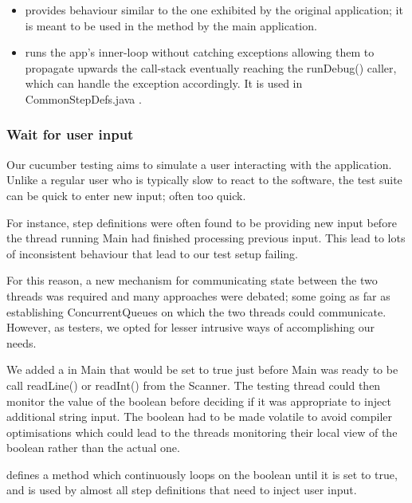 \begin{itemize}
	\item {} provides behaviour similar to the one exhibited by the original application; it is meant to be used in the  method by the main application. 
	\item {} runs the app's inner-loop without catching exceptions allowing them to propagate upwards the call-stack eventually reaching the runDebug() caller, which can handle the exception accordingly. It is used in CommonStepDefs.java . 
\end{itemize}

\subsubsection{Wait for user input}
Our cucumber testing aims to simulate a user interacting with the application.  Unlike a regular user who is typically slow to react to the software, the test suite can be quick to enter new input; often too quick. 
\par
For instance, step definitions were often found to be providing new input before the thread running Main had finished processing previous input. This lead to lots of inconsistent behaviour that lead to our test setup failing. 
\par 
For this reason, a new mechanism for communicating state between the two threads was required and many approaches were debated; some going as far as establishing ConcurrentQueues on which the two threads could communicate.
However, as testers, we opted for lesser intrusive ways of accomplishing our needs. 
\par 
We added a  in Main that would be set to true just before Main was ready to be call readLine() or readInt() from the Scanner. The testing thread could then monitor the value of the boolean before deciding if it was appropriate to inject additional string input. The boolean had to be made volatile to avoid compiler optimisations which could lead to the threads monitoring their local view of the boolean rather than the actual one. 
\par 
{} defines a method  which continuously loops on the boolean until it is set to true, and is used by almost all step definitions that need to inject user input. 

